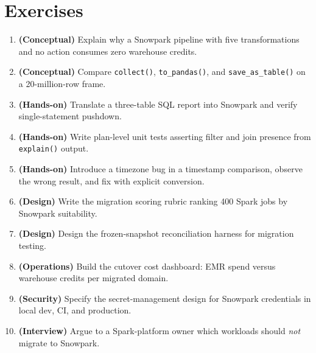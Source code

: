 \section{Exercises}
\begin{enumerate}
    \item \textbf{(Conceptual)} Explain why a Snowpark pipeline with five transformations and no action consumes zero warehouse credits.
    \item \textbf{(Conceptual)} Compare \texttt{collect()}, \texttt{to\_pandas()}, and \texttt{save\_as\_table()} on a 20-million-row frame.
    \item \textbf{(Hands-on)} Translate a three-table SQL report into Snowpark and verify single-statement pushdown.
    \item \textbf{(Hands-on)} Write plan-level unit tests asserting filter and join presence from \texttt{explain()} output.
    \item \textbf{(Hands-on)} Introduce a timezone bug in a timestamp comparison, observe the wrong result, and fix with explicit conversion.
    \item \textbf{(Design)} Write the migration scoring rubric ranking 400 Spark jobs by Snowpark suitability.
    \item \textbf{(Design)} Design the frozen-snapshot reconciliation harness for migration testing.
    \item \textbf{(Operations)} Build the cutover cost dashboard: EMR spend versus warehouse credits per migrated domain.
    \item \textbf{(Security)} Specify the secret-management design for Snowpark credentials in local dev, CI, and production.
    \item \textbf{(Interview)} Argue to a Spark-platform owner which workloads should \emph{not} migrate to Snowpark.
\end{enumerate}
